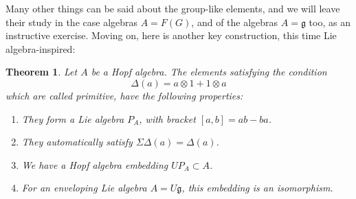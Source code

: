 \documentclass[12pt]{amsbook}
\newtheorem{theorem}{Theorem}[chapter]
\begin{document}
Many other things can be said about the group-like elements, and we will leave their study in the case algebras $A=F(G)$, and of the algebras $A=\mathfrak g$ too, as an instructive exercise. Moving on, here is another key construction, this time Lie algebra-inspired:


\begin{theorem}
Let $A$ be a Hopf algebra. The elements satisfying the condition
$$\Delta(a)=a\otimes 1+1\otimes a$$
which are called primitive, have the following properties:
\begin{enumerate}
\item They form a Lie algebra $P_A$, with bracket $[a,b]=ab-ba$.

\item They automatically satisfy $\Sigma\Delta(a)=\Delta(a)$.

\item We have a Hopf algebra embedding $UP_A\subset A$.

\item For an enveloping Lie algebra $A=U\mathfrak g$, this embedding is an isomorphism.
\end{enumerate}
\end{theorem}
\end{document}
